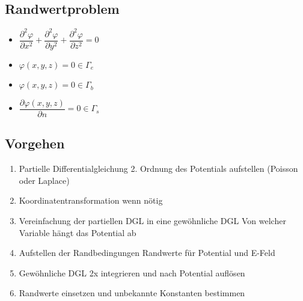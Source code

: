 \subsection{Randwertproblem}
\begin{multicols}{2}
\begin{itemize}
	\item $\dfrac{\partial^2\varphi}{\partial x^2} +  \dfrac{\partial^2\varphi}{\partial y^2} + \dfrac{\partial^2\varphi}{\partial z^2}=0 $
	\item $\varphi(x,y,z)=0 \in \Gamma_e$
	\item $\varphi(x,y,z)=0 \in \Gamma_b$
	\item $ \dfrac{\partial\varphi(x,y,z)}{\partial n} = 0 \in \Gamma_s$
\end{itemize}
\end{multicols}
\subsection{Vorgehen}
\begin{enumerate}
	\item Partielle Differentialgleichung 2. Ordnung des Potentials aufstellen (Poisson oder Laplace)
	\item Koordinatentransformation wenn nötig
	\item Vereinfachung der partiellen DGL in eine gewöhnliche DGL 
	\subitem Von welcher Variable hängt das Potential ab
	\item Aufstellen der Randbedingungen
	\subitem Randwerte für Potential und E-Feld
	\item Gewöhnliche DGL 2x integrieren und nach Potential auflösen
	\item Randwerte einsetzen und unbekannte Konstanten bestimmen
\end{enumerate}
\clearpage
\pagebreak
